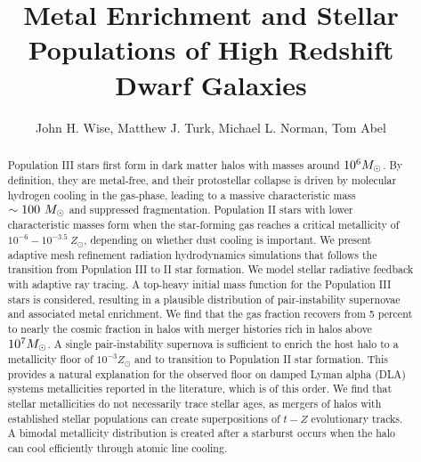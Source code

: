 \documentclass[12pt,preprint]{aastex}
\begin{document}

\title{Metal Enrichment and Stellar Populations of High Redshift Dwarf
  Galaxies}

\author{John H. Wise, 
  Matthew J. Turk,
  Michael L. Norman,
  Tom Abel}


\begin{abstract}

  Population III stars first form in dark matter halos with masses
  around $10^6 \Ms$.  By definition, they are metal-free, and their
  protostellar collapse is driven by molecular hydrogen cooling in the
  gas-phase, leading to a massive characteristic mass $\sim 100~\Ms$
  and suppressed fragmentation.  Population II stars with lower
  characteristic masses form when the star-forming gas reaches a
  critical metallicity of $10^{-6} - 10^{-3.5}~Z_\odot$, depending on
  whether dust cooling is important.  We present adaptive mesh
  refinement radiation hydrodynamics simulations that follows the
  transition from Population III to II star formation.  We model
  stellar radiative feedback with adaptive ray tracing.  A top-heavy
  initial mass function for the Population III stars is considered,
  resulting in a plausible distribution of pair-instability supernovae
  and associated metal enrichment.  We find that the gas fraction
  recovers from 5 percent to nearly the cosmic fraction in halos with
  merger histories rich in halos above $10^7 \Ms$.  A single
  pair-instability supernova is sufficient to enrich the host halo to
  a metallicity floor of $10^{-3} Z_\odot$ and to transition to
  Population II star formation.  This provides a natural explanation
  for the observed floor on damped Lyman alpha (DLA) systems
  metallicities reported in the literature, which is of this order.
  We find that stellar metallicities do not necessarily trace stellar
  ages, as mergers of halos with established stellar populations can
  create superpositions of $t-Z$ evolutionary tracks.  A bimodal
  metallicity distribution is created after a starburst occurs when
  the halo can cool efficiently through atomic line cooling.

\end{abstract}
\end{document}
